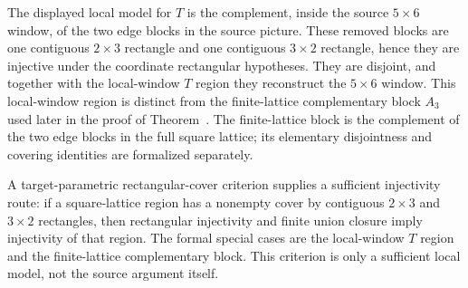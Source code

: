 \documentclass{article}
\begin{document}
The displayed local model for $T$ is the complement, inside the source
$5\times6$ window, of the two edge blocks in the source picture. These removed
blocks are one contiguous $2\times3$ rectangle and one contiguous $3\times2$
rectangle, hence they are injective under the coordinate rectangular
hypotheses. They are disjoint, and together with the local-window $T$ region
they reconstruct the $5\times6$ window. This local-window region is distinct
from the finite-lattice complementary block $A_3$ used later in the proof of
Theorem~. The finite-lattice block is the complement of the two edge
blocks in the full square lattice; its elementary disjointness and covering
identities are formalized separately.

A target-parametric rectangular-cover criterion supplies a sufficient
injectivity route: if a square-lattice region has a nonempty cover by
contiguous $2\times3$ and $3\times2$ rectangles, then rectangular injectivity
and finite union closure imply injectivity of that region. The formal special
cases are the local-window $T$ region and the finite-lattice complementary
block. This criterion is only a sufficient local model, not the source
argument itself.
\end{document}
